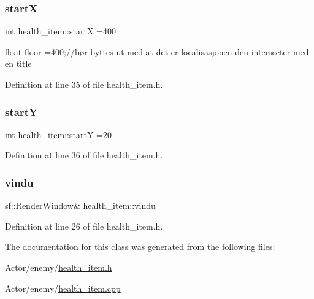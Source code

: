\hypertarget{classhealth__item_a23c7b1b11d688e48504c21d52b7d9fdf}{}\label{classhealth__item_a23c7b1b11d688e48504c21d52b7d9fdf} 
\subsubsection{\texorpdfstring{startX}{startX}}
{\footnotesize\ttfamily int health\+\_\+item\+::startX =400}



float floor =400;//bør byttes ut med at det er localisasjonen den intersecter med en title 



Definition at line 35 of file health\+\_\+item.\+h.

\hypertarget{classhealth__item_a4f3840b30f8526f3d8d9ea1823c1e406}{}\label{classhealth__item_a4f3840b30f8526f3d8d9ea1823c1e406} 
\subsubsection{\texorpdfstring{startY}{startY}}
{\footnotesize\ttfamily int health\+\_\+item\+::startY =20}



Definition at line 36 of file health\+\_\+item.\+h.

\hypertarget{classhealth__item_ab502a99715215a683861ce27258dcc7d}{}\label{classhealth__item_ab502a99715215a683861ce27258dcc7d} 
\subsubsection{\texorpdfstring{vindu}{vindu}}
{\footnotesize\ttfamily sf\+::\+Render\+Window\& health\+\_\+item\+::vindu}



Definition at line 26 of file health\+\_\+item.\+h.



The documentation for this class was generated from the following files\+:\begin{DoxyCompactItemize}
\item 
Actor/enemy/\hyperlink{health__item_8h}{health\+\_\+item.\+h}\item 
Actor/enemy/\hyperlink{health__item_8cpp}{health\+\_\+item.\+cpp}\end{DoxyCompactItemize}
